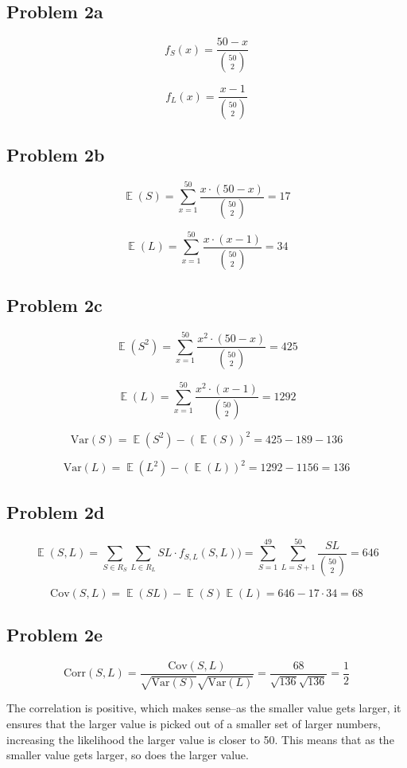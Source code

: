\documentclass{article}
\newcommand{\Var}{\mathrm{Var}}
\newcommand{\Cov}{\mathrm{Cov}}
\newcommand{\Corr}{\mathrm{Corr}}
\DeclareMathOperator{\EX}{\mathbb{E}}
\begin{document}
\subsection{Problem 2a}

$$f_S(x) = \frac{50 - x}{\binom{50}{2}}$$

$$f_L(x) = \frac{x - 1}{\binom{50}{2}}$$

\subsection{Problem 2b}

$$\EX(S) = \sum_{x = 1}^{50} \frac{x \cdot (50 - x)}{\binom{50}{2}} = 17$$

$$\EX(L) = \sum_{x = 1}^{50} \frac{x \cdot (x - 1)}{\binom{50}{2}} = 34$$

\subsection{Problem 2c}

$$\EX(S^2) = \sum_{x = 1}^{50} \frac{x^2 \cdot (50 - x)}{\binom{50}{2}} = 425$$

$$\EX(L) = \sum_{x = 1}^{50} \frac{x^2 \cdot (x - 1)}{\binom{50}{2}} = 1292$$

$$\Var(S) = \EX(S^2) - (\EX(S))^2 = 425 - 189 - 136$$

$$\Var(L) = \EX(L^2) - (\EX(L))^2 = 1292 - 1156 = 136$$

\subsection{Problem 2d}

$$\EX(S, L) = \sum_{S \in R_S}^{} \sum_{L \in R_L}^{} SL \cdot f_{S, L}(S, L)) = \sum_{S = 1}^{49} \sum_{L = S + 1}^{50} \frac{SL}{\binom{50}{2}} = 646$$

$$\Cov(S, L) = \EX(SL) - \EX(S)\EX(L) = 646 - 17 \cdot 34 = 68$$

\subsection{Problem 2e}

$$\Corr(S, L) = \frac{\Cov(S, L)}{\sqrt{\Var(S)}\sqrt{\Var(L)}} = \frac{68}{\sqrt{136}\sqrt{136}} = \frac{1}{2}$$

The correlation is positive, which makes sense--as the smaller value gets larger, it ensures that the larger value is picked out of a smaller set of larger numbers, increasing the likelihood the larger value is closer to 50. This means that as the smaller value gets larger, so does the larger value.
\end{document}
